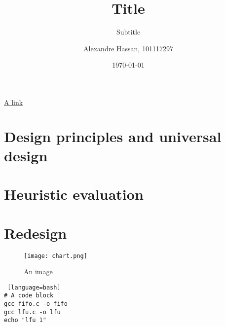 \documentclass{article}
\title{Title}
\subtitle{Subtitle}
\author{Alexandre Hassan, 101117297 }
\date{\monthyeardate\today }
\begin{document}
\maketitle
\href{https://carleton.ca/}{A link}

\section{Design principles and universal design}


\section{Heuristic evaluation}


\section{Redesign}


\begin{figure}[h]
\texttt{[image: chart.png]}
\caption{An image}
\centering
\end{figure}

\begin{lstlisting} [language=bash]
# A code block
gcc fifo.c -o fifo
gcc lfu.c -o lfu
echo "lfu 1"
\end{lstlisting}
\end{document}
